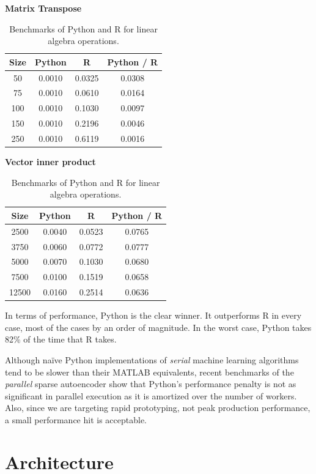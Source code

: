 \documentclass[%
  final,
  notitlepage,
  narroweqnarray,
  inline,
]{ieee}
\begin{document}
\begin{table}[h!]
\begin{center}
    \vspace{1em}
    \textbf{Matrix Transpose} \\
    \begin{tabular}{cccc}
      Size  & Python  &  R       & Python / R \\
      \hline
      50  & 0.0010  & 0.0325 & 0.0308 \\
      75  & 0.0010  & 0.0610 & 0.0164 \\
      100 & 0.0010  & 0.1030 & 0.0097 \\
      150 & 0.0010  & 0.2196 & 0.0046 \\
      250 & 0.0010  & 0.6119 & 0.0016 \\
    \end{tabular}

    \vspace{1em}
    \textbf{Vector inner product} \\
    \begin{tabular}{cccc}
      Size  & Python &  R       & Python / R \\
      \hline
      2500  & 0.0040 & 0.0523 & 0.0765 \\
      3750  & 0.0060 & 0.0772 & 0.0777 \\
      5000  & 0.0070 & 0.1030 & 0.0680 \\
      7500  & 0.0100 & 0.1519 & 0.0658 \\
      12500 & 0.0160 & 0.2514 & 0.0636 \\
    \end{tabular}
  \end{center}
  \caption{Benchmarks of Python and R for linear algebra
    operations.}
  \label{PythonvsR}
\end{table}

In terms of performance, Python is the clear winner. It outperforms R in every
case, most of the cases by an order of magnitude. In the worst case, Python
takes 82\% of the time that R takes.

Although na\"{i}ve Python implementations of {\it serial} machine learning
algorithms tend to be slower than their MATLAB equivalents, recent benchmarks
of the {\it parallel} sparse autoencoder show that Python's performance penalty
is not as significant in parallel execution as it is amortized over the number
of workers. Also, since we are targeting rapid prototyping, not peak production
performance, a small performance hit is acceptable.

\section{Architecture}
\end{document}
